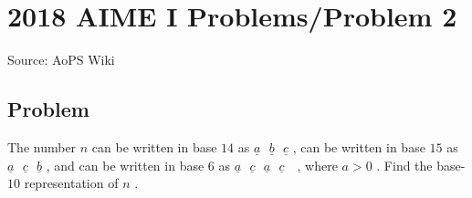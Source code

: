 \documentclass[12pt]{article}
\begin{document}
\section*{{2018 AIME I Problems/Problem 2}}
Source: AoPS Wiki

\subsection*{Problem}
The number $n$ can be written in base $14$ as $\underline{a}\text{ }\underline{b}\text{ }\underline{c}$ , can be written in base $15$ as $\underline{a}\text{ }\underline{c}\text{ }\underline{b}$ , and can be written in base $6$ as $\underline{a}\text{ }\underline{c}\text{ }\underline{a}\text{ }\underline{c}\text{ }$ , where $a > 0$ . Find the base- $10$ representation of $n$ .
\end{document}
